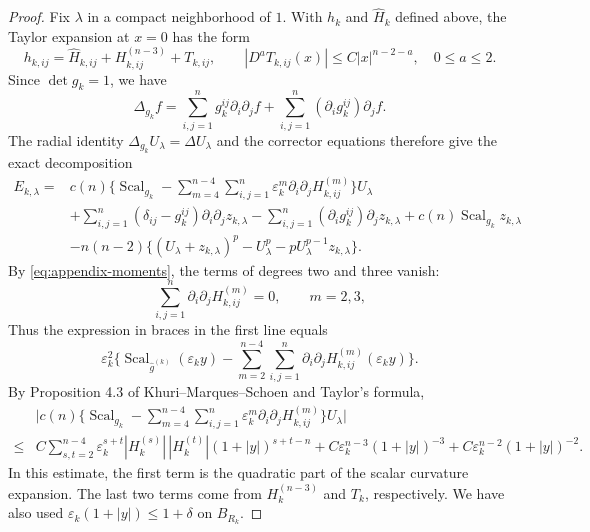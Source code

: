 \documentclass[11pt]{article}
\numberwithin{equation}{section}
\theoremstyle{remark}
\begin{document}
\begin{proof}
 Fix $\lambda$ in a compact neighborhood of $1$. With $h_k$ and
$\widehat H_k$ defined above, the Taylor expansion at $x=0$ has the form
{
\[
 h_{k,ij}=\widehat H_{k,ij}+H_{k,ij}^{(n-3)}+T_{k,ij},
 \qquad
 |D^aT_{k,ij}(x)|\le C|x|^{n-2-a},
 \quad 0\le a\le2.
\]
}
 Since $\det g_k=1$, we have
{
\[
 \Delta_{g_k}f
 =\sum_{i,j=1}^ng_k^{ij}\partial_i\partial_jf
  +\sum_{i,j=1}^n(\partial_i g_k^{ij})\partial_jf.
\]
}
 The radial identity $\Delta_{g_k}U_\lambda=\Delta U_\lambda$ and the
corrector equations therefore give the exact decomposition
{
\begin{equation*}
\begin{aligned}
 E_{k,\lambda}
={}&c(n)\Bigg\{\operatorname{Scal}_{g_k}
 -\sum_{m=4}^{n-4}\sum_{i,j=1}^n
   \varepsilon_k^m\partial_i\partial_jH_{k,ij}^{(m)}\Bigg\}U_\lambda\\
&+\sum_{i,j=1}^n(\delta_{ij}-g_k^{ij})
       \partial_i\partial_jz_{k,\lambda}
 -\sum_{i,j=1}^n(\partial_i g_k^{ij})
       \partial_jz_{k,\lambda}
 +c(n)\operatorname{Scal}_{g_k}z_{k,\lambda}\\
&-n(n-2)\Big\{(U_\lambda+z_{k,\lambda})^p-U_\lambda^p
       -pU_\lambda^{p-1}z_{k,\lambda}\Big\}.
\end{aligned}
\end{equation*}
}
By \eqref{eq:appendix-moments}, the terms of degrees two and three vanish:
{
\[
 \sum_{i,j=1}^n\partial_i\partial_jH_{k,ij}^{(m)}=0,
 \qquad m=2,3,
\]
}
 Thus the expression in braces in the
first line equals
{
\[
 \varepsilon_k^2\Bigg\{\operatorname{Scal}_{\widehat g^{(k)}}(\varepsilon_ky)
 -\sum_{m=2}^{n-4}\sum_{i,j=1}^n
  \partial_i\partial_jH_{k,ij}^{(m)}(\varepsilon_ky)\Bigg\}.
\]
}
 By Proposition  4.3 of Khuri--Marques--Schoen \cite{KMS} and Taylor's
formula,
{
\begin{equation*}
\begin{aligned}
&\Bigg|c(n)\Bigg\{\operatorname{Scal}_{g_k}
 -\sum_{m=4}^{n-4}\sum_{i,j=1}^n
 \varepsilon_k^m\partial_i\partial_jH_{k,ij}^{(m)}\Bigg\}
 U_\lambda\Bigg|\\
\le{}&C\sum_{s,t=2}^{n-4}
 \varepsilon_k^{s+t}|H_k^{(s)}|\,|H_k^{(t)}|
 (1+|y|)^{s+t-n}
 +C\varepsilon_k^{n-3}(1+|y|)^{-3}
 +C\varepsilon_k^{n-2}(1+|y|)^{-2}.
\end{aligned}
\end{equation*}
}
In this estimate, the first term is the quadratic part of the scalar
curvature expansion.  The last two terms come from
$H_k^{(n-3)}$ and $T_k$, respectively.  We have also used
$\varepsilon_k(1+|y|)\le1+\delta$ on $B_{R_k}$.

\end{proof}
\end{document}
